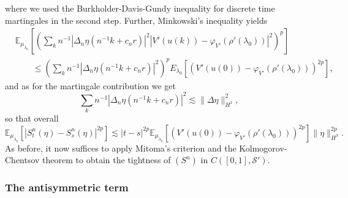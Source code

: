 \documentclass[11pt, a4paper]{article}
\newcommand{\CS}{\mathscr{S}}
\newcommand{\1}{\mathbf{1}}
\begin{document}
where we used the Burkholder-Davis-Gundy inequality for discrete time
martingales in the second step. Further, Minkowski's inequality yields
\begin{align*}
 &\mathbb{E}_{{\mu}_{\lambda_0}} \left[ \left( \sum_k n^{- 1} | \Delta_n
 \eta (n^{- 1} k + c_n r) |^2 | V' (u (k)) - \varphi_{V'} (\rho'
 (\lambda_0)) |^2 \right)^p \right] \\
 &\qquad \leqslant \left( \sum_k n^{- 1} | \Delta_n \eta (n^{- 1} k + c_n r) |^2
 \right)^p E_{\lambda_0} [(V' (u (0)) - \varphi_{V'} (\rho' (\lambda_0)))^{2
 p}],
\end{align*}
and as for the martingale contribution we get
\[ \sum_k n^{- 1} | \Delta_n \eta (n^{- 1} k + c_n r) |^2 \lesssim \| \Delta
   \eta \|_{H^1}^2, \]
so that overall
\[ \mathbb{E}_{{\mu}_{\lambda_0}} [| S^n_t (\eta) - S^n_s (\eta) |^{2 p}]
   \lesssim | t - s |^{2 p} \mathbb{E}_{{\mu}_{\lambda_0}} [(V' (u (0)) -
   \varphi_{V'} (\rho' (\lambda_0)))^{2 p}] \| \eta \|_{H^3}^{2 p} . \]
   As before, it now suffices to apply Mitoma's criterion and the Kolmogorov-Chentsov theorem to obtain the tightness of $(S^n)$ in $C ([0, 1], \CS')$.

\subsubsection{The antisymmetric term}\label{sec:antisymmetric}
\end{document}
